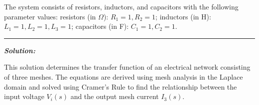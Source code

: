 \documentclass[11pt]{article}
\begin{document}
\begin{figure}[h]
    \centering
\end{figure}

\noindent The system consists of resistors, inductors, and capacitors with the following parameter values: resistors (in $\Omega$): \( R_1 = 1, R_2 = 1 \); inductors (in H): \( L_1 = 1, L_2 = 1, L_3 = 1 \); capacitors (in F): \( C_1 = 1, C_2 = 1 \).

\noindent\rule{\textwidth}{1pt}

\vspace{12pt}

\noindent \textbf{\textit{Solution:}}

\noindent This solution determines the transfer function of an electrical network consisting of three meshes. The equations are derived using mesh analysis in the Laplace domain and solved using Cramer's Rule to find the relationship between the input voltage $V_i(s)$ and the output mesh current $I_3(s)$.\\
\end{document}
